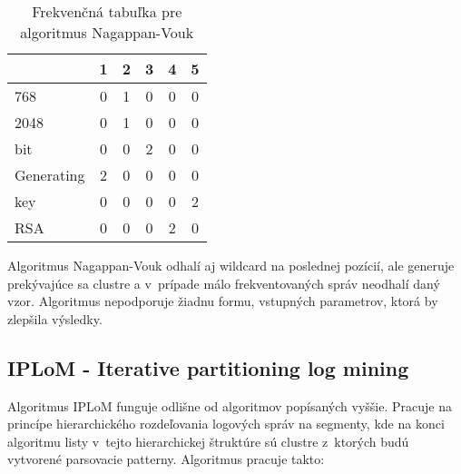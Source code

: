 \begin{table}[htbp]
\centering
\begin{tabularx}{175px}{ | X | c | c | c | c | c | }
\hline
           & 1 & 2 & 3 & 4 & 5 \\ \hline
768        & 0 & 1 & 0 & 0 & 0 \\ \hline
2048       & 0 & 1 & 0 & 0 & 0 \\ \hline
bit        & 0 & 0 & 2 & 0 & 0 \\ \hline
Generating & 2 & 0 & 0 & 0 & 0 \\ \hline
key        & 0 & 0 & 0 & 0 & 2 \\ \hline
RSA        & 0 & 0 & 0 & 2 & 0 \\ \hline
\end{tabularx}
\caption{Frekvenčná tabuľka pre algoritmus Nagappan-Vouk}
\label{fig:nagappan}
\end{table}

Algoritmus Nagappan-Vouk odhalí aj wildcard na poslednej pozícií, ale generuje prekývajúce sa clustre a v~prípade málo frekventovaných správ neodhalí daný vzor. Algoritmus nepodporuje žiadnu formu, vstupných parametrov, ktorá by zlepšila výsledky.

\subsection{IPLoM - Iterative partitioning log mining}
Algoritmus IPLoM \parencite{iplom}  funguje odlišne od algoritmov popísaných vyššie. Pracuje na princípe hierarchického rozdeľovania logových správ na segmenty, kde na konci algoritmu listy v~tejto hierarchickej štruktúre sú clustre z~ktorých budú vytvorené parsovacie patterny. Algoritmus pracuje takto:

